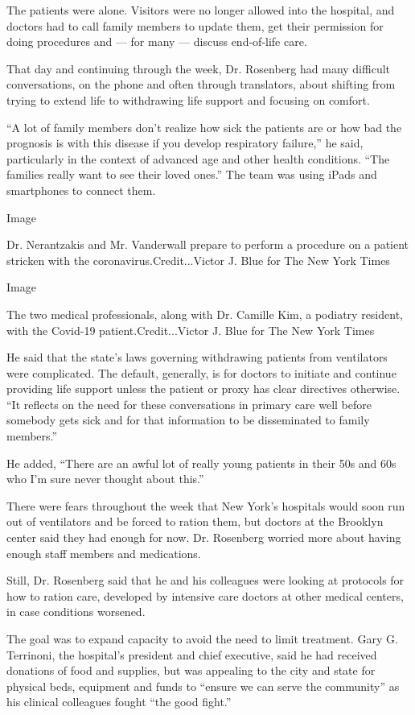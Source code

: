 The patients were alone. Visitors were no longer allowed into the
hospital, and doctors had to call family members to update them, get
their permission for doing procedures and --- for many --- discuss
end-of-life care.

That day and continuing through the week, Dr. Rosenberg had many
difficult conversations, on the phone and often through translators,
about shifting from trying to extend life to withdrawing life support
and focusing on comfort.

``A lot of family members don't realize how sick the patients are or how
bad the prognosis is with this disease if you develop respiratory
failure,'' he said, particularly in the context of advanced age and
other health conditions. ``The families really want to see their loved
ones.'' The team was using iPads and smartphones to connect them.

Image

Dr. Nerantzakis and Mr. Vanderwall prepare to perform a procedure on a
patient stricken with the coronavirus.Credit...Victor J. Blue for The
New York Times

Image

The two medical professionals, along with Dr. Camille Kim, a podiatry
resident, with the Covid-19 patient.Credit...Victor J. Blue for The New
York Times

He said that the state's laws governing withdrawing patients from
ventilators were complicated. The default, generally, is for doctors to
initiate and continue providing life support unless the patient or proxy
has clear directives otherwise. ``It reflects on the need for these
conversations in primary care well before somebody gets sick and for
that information to be disseminated to family members.''

He added, ``There are an awful lot of really young patients in their 50s
and 60s who I'm sure never thought about this.''

There were fears throughout the week that New York's hospitals would
soon run out of ventilators and be forced to ration them, but doctors at
the Brooklyn center said they had enough for now. Dr. Rosenberg worried
more about having enough staff members and medications.

Still, Dr. Rosenberg said that he and his colleagues were looking at
protocols for how to ration care, developed by intensive care doctors at
other medical centers, in case conditions worsened.

The goal was to expand capacity to avoid the need to limit treatment.
Gary G. Terrinoni, the hospital's president and chief executive, said he
had received donations of food and supplies, but was appealing to the
city and state for physical beds, equipment and funds to ``ensure we can
serve the community'' as his clinical colleagues fought ``the good
fight.''

